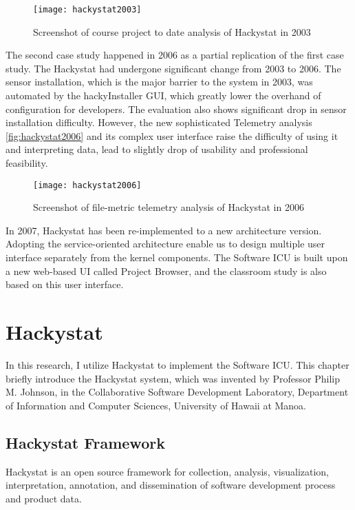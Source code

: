 \begin{figure}[htbp]
   \centering
   \texttt{[image: hackystat2003]} 
   \caption{Screenshot of course project to date analysis of Hackystat in 2003}
   \label{fig:hackystat2003}
\end{figure}

The second case study happened in 2006 as a partial replication of the first case study\cite{csdl2-07-02}. The Hackystat had undergone significant change from 2003 to 2006. The sensor installation, which is the major barrier to the system in 2003, was automated by the hackyInstaller GUI, which greatly lower the overhand of configuration for developers. The evaluation also shows significant drop in sensor installation difficulty. However, the new sophisticated Telemetry analysis \autoref{fig:hackystat2006} and its complex user interface raise the difficulty of using it and interpreting data, lead to slightly drop of usability and professional feasibility.

\begin{figure}[htbp]
   \centering
   \texttt{[image: hackystat2006]} 
   \caption{Screenshot of file-metric telemetry analysis of Hackystat in 2006}
   \label{fig:hackystat2006}
\end{figure}

In 2007, Hackystat has been re-implemented to a new architecture version. Adopting the service-oriented architecture enable us to design multiple user interface separately from the kernel components. The Software ICU is built upon a new web-based UI called Project Browser, and the classroom study is also based on this user interface.


\chapter{Hackystat}
In this research, I utilize Hackystat to implement the Software ICU. This chapter briefly introduce the Hackystat system, which was invented by Professor Philip M. Johnson, in the Collaborative Software Development Laboratory, Department of Information and Computer Sciences, University of Hawaii at Manoa. 
 

\section{Hackystat Framework}
Hackystat is an open source framework for collection, analysis, visualization, interpretation, annotation, and dissemination of software development process and product data.

